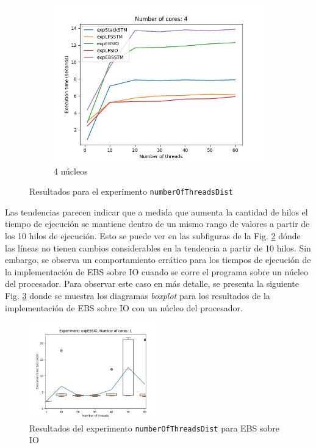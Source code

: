 \begin{figure}[H]
\begin{subfigure}[b]{0.5\textwidth}
        \includegraphics[width=\textwidth]{images/numberOfThreadsDist/plots/4.png}
        \caption{4 núcleos}
        \label{subfig:numberOfThreadsDist-4core}
    \end{subfigure}
    \caption{Resultados para el experimento \texttt{numberOfThreadsDist}}
    \label{fig:numberOfThreadsDist-all}
\end{figure}

Las tendencias parecen indicar que a medida que aumenta la cantidad de hilos el tiempo de ejecución se mantiene dentro de un mismo rango de valores a partir de los 10 hilos de ejecución. Esto se puede ver en las subfiguras de la Fig. \ref{fig:numberOfThreadsDist-all} dónde las líneas no tienen cambios considerables en la tendencia a partir de 10 hilos.
Sin embargo, se observa un comportamiento errático para los tiempos de ejecución de la implementación de EBS sobre IO cuando se corre el programa sobre un núcleo del procesador.
Para observar este caso en más detalle, se presenta la siguiente Fig. \ref{fig:numberOfThreadsDist-EBSIO} donde se muestra los diagramas \emph{boxplot} para los resultados de la implementación de EBS sobre IO con un núcleo del procesador.

\clearpage
\begin{figure}[H]
    \centering
    \includegraphics[width=0.5\textwidth]{images/numberOfThreadsDist/plots/expEBSIO-1.png}
    \caption{Resultados del experimento \texttt{numberOfThreadsDist} para EBS sobre IO}
    \label{fig:numberOfThreadsDist-EBSIO}
\end{figure}

